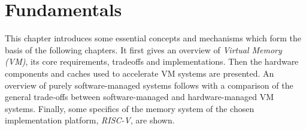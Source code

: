 \chapter{Fundamentals} %
\label{chap:fund}

%


This chapter introduces some essential concepts and mechanisms which form the basis of the following
chapters. It first gives an overview of \textit{Virtual Memory (VM)}, its core requirements,
tradeoffs and implementations.
Then the hardware components and caches used to accelerate VM systems are
presented.
An overview of purely software-managed systems follows with a comparison of the general trade-offs
between software-managed and hardware-managed VM systems.
Finally, some specifics of the memory system of the chosen implementation platform, \textit{RISC-V},
are shown.

